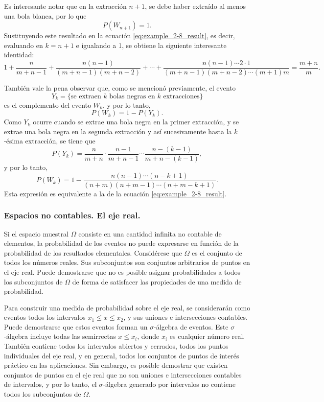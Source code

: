 \documentclass[a4paper]{report}
\begin{document}
Es interesante notar que en la extracción \(n+1\), se debe haber extraído al menos una bola blanca, por lo que
\[
 P(W_{n+1})=1.
\]
Sustituyendo este resultado en la ecuación \ref{eq:example_2-8_result}, es decir, evaluando en \(k=n+1\) e igualando a 1, se obtiene la siguiente interesante identidad:
\[
 1+\frac{n}{m+n-1}+\frac{n(n-1)}{(m+n-1)(m+n-2)}+\cdots+\frac{n(n-1)\cdots2\cdot1}{(m+n-1)(m+n-2)\cdots(m+1)m}=\frac{m+n}{m}.
\]

También vale la pena observar que, como se mencionó previamente, el evento
\[
 Y_k=\{\textrm{se extraen }k\textrm{ bolas negras en }k\textrm{ extracciones}\}
\]
es el complemento del evento \(W_k\), y por lo tanto,
\[
 P(W_k)=1-P(Y_k).
\]
Como \(Y_k\) ocurre cuando se extrae una bola negra en la primer extracción, y se extrae una bola negra en la segunda extracción y así sucesivamente hasta la \(k\)-ésima extracción, se tiene que
\[
 P(Y_k)=\frac{n}{m+n}\cdot\frac{n-1}{m+n-1}\cdots\frac{n-(k-1)}{m+n-(k-1)},
\]
y por lo tanto,
\[
 P(W_k)=1-\frac{n(n-1)\cdots(n-k+1)}{(n+m)(n+m-1)\cdots(n+m-k+1)}.
\]
Esta expresión es equivalente a la de la ecuación \ref{eq:example_2-8_result}.

\subsubsection{Espacios no contables. El eje real.}

Si el espacio muestral \(\Omega\) consiste en una cantidad infinita no contable de elementos, la probabilidad de los eventos no puede expresarse en función de la probabilidad de los resultados elementales.
Considérese que \(\Omega\) es el conjunto de todos los números reales. Sus subconjuntos son conjuntos arbitrarios de puntos en el eje real. Puede demostrarse que no es posible asignar probabilidades a todos los subconjuntos de \(\Omega\) de forma de satisfacer las propiedades de una medida de probabilidad. 

Para construir una medida de probabilidad sobre el eje real, se considerarán como eventos todos los intervalos \(x_1\leq x\leq x_2\), y sus uniones e intersecciones contables. Puede demostrarse que estos eventos forman un \(\sigma\)-álgebra de eventos. Este \(\sigma\)-álgebra incluye todas las semirrectas \(x\leq x_i\), donde \(x_i\) es cualquier número real. También contiene todos los intervalos abiertos y cerrados, todos los puntos individuales del eje real, y en general, todos los conjuntos de puntos de interés práctico en las aplicaciones. Sin embargo, es posible demostrar que existen conjuntos de puntos en el eje real que no son uniones e intersecciones contables de intervalos, y por lo tanto, el \(\sigma\)-álgebra generado por intervalos no contiene todos los subconjuntos de \(\Omega\). 
\end{document}
